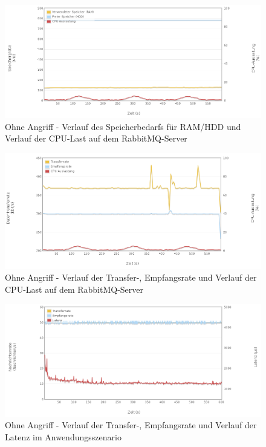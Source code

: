 \documentclass[	a4paper,
			11pt,
			oneside,
			parskip]{scrartcl}
\begin{document}
		\begin{figure}[!htb]
			\centering
			\includegraphics[width=\textwidth]{img/std/std_server1.png}
			\caption{Ohne Angriff - Verlauf des Speicherbedarfs für RAM/HDD und Verlauf der CPU-Last auf dem RabbitMQ-Server}
			\label{fig:std-server1}
		\end{figure}
		
		\begin{figure}[!htb]
			\centering
			\includegraphics[width=\textwidth]{img/std/std_server2.png}
			\caption{Ohne Angriff - Verlauf der Transfer-, Empfangsrate und Verlauf der CPU-Last auf dem RabbitMQ-Server}
			\label{fig:std-server2}
		\end{figure}
		
		\begin{figure}[!htb]
			\centering
			\includegraphics[width=\textwidth]{img/std/std_scenario.png}
			\caption{Ohne Angriff - Verlauf der Transfer-, Empfangsrate und Verlauf der Latenz im Anwendungsszenario}
			\label{fig:std-scenario}
		\end{figure}
	
\end{document}
